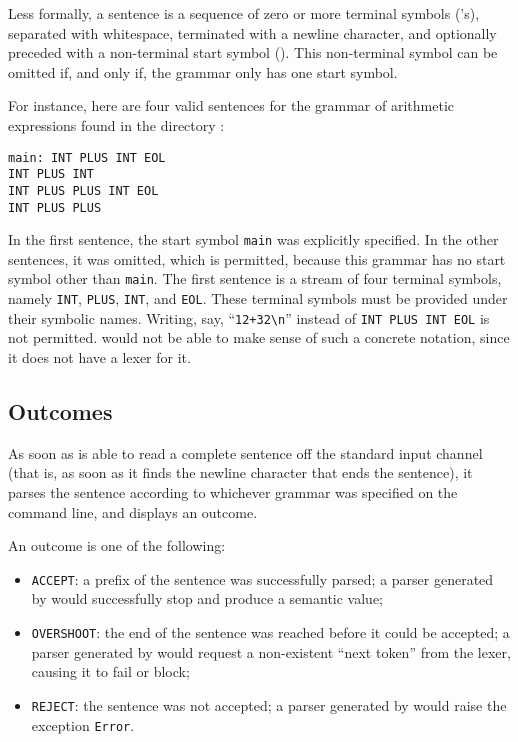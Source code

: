 \documentclass[onecolumn,11pt,nocopyrightspace,preprint]{sigplanconf}
\begin{document}
Less formally, a sentence is a sequence of zero or more terminal symbols
('s), separated with whitespace, terminated with a newline character,
and optionally preceded with a non-terminal start symbol (). This
non-terminal symbol can be omitted if, and only if, the grammar only has one
start symbol.

For instance, here are four valid sentences for the grammar of arithmetic
expressions found in the directory :
%
\begin{verbatim}
main: INT PLUS INT EOL
INT PLUS INT
INT PLUS PLUS INT EOL
INT PLUS PLUS
\end{verbatim}
%
In the first sentence, the start symbol \texttt{main} was explicitly
specified. In the other sentences, it was omitted, which is permitted, because
this grammar has no start symbol other than \texttt{main}.  The first sentence
is a stream of four terminal symbols, namely \texttt{INT}, \texttt{PLUS},
\texttt{INT}, and \texttt{EOL}. These terminal symbols must be provided under
their symbolic names. Writing, say, ``\texttt{12+32\textbackslash n}'' instead
of \texttt{INT PLUS INT EOL} is not permitted. \menhir would not be able to
make sense of such a concrete notation, since it does not have a lexer for it.


\subsection{Outcomes}
\label{sec:outcomes}

As soon as \menhir is able to read a complete sentence off the standard input
channel (that is, as soon as it finds the newline character that ends the
sentence), it parses the sentence according to whichever grammar was specified
on the command line, and displays an outcome.

An outcome is one of the following:
\begin{itemize}
\item \texttt{ACCEPT}: a prefix of the sentence was successfully parsed;
      a parser generated by \menhir would successfully stop and produce
      a semantic value;
\item \texttt{OVERSHOOT}: the end of the sentence was reached before it
      could be accepted; a parser generated by \menhir would request a
      non-existent ``next token'' from the lexer, causing it to fail or
      block;
\item \texttt{REJECT}: the sentence was not accepted; a parser generated
      by \menhir would raise the exception \texttt{Error}.
\end{itemize}
\end{document}
